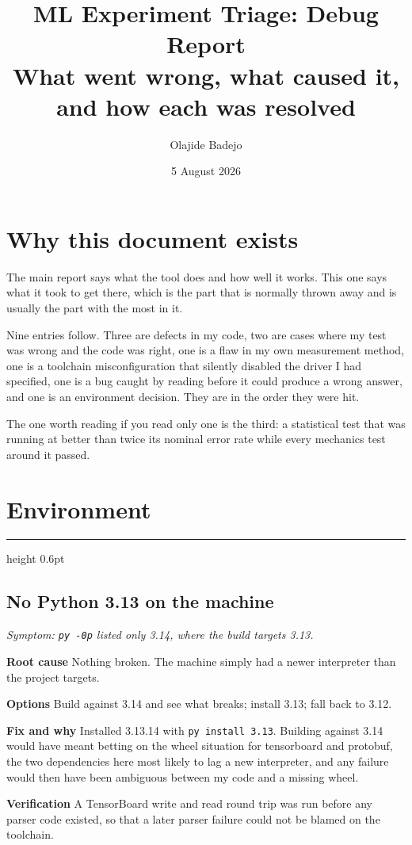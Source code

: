 \documentclass[11pt,a4paper]{article}
\title{\textbf{ML Experiment Triage: Debug Report}\\[0.4em]
\large What went wrong, what caused it, and how each was resolved}
\author{Olajide Badejo}
\date{5 August 2026}
\newcommand{\entry}[2]{%
  \vspace{0.6em}%
  {\color{rulegrey}\hrule height 0.6pt}%
  \vspace{0.5em}%
  \subsection*{#1}%
  \textit{\small #2}\par\vspace{0.3em}%
}
\newcommand{\field}[1]{\vspace{0.35em}\textbf{#1}\quad}
\begin{document}
\maketitle

\section*{Why this document exists}

The main report says what the tool does and how well it works. This one says what
it took to get there, which is the part that is normally thrown away and is
usually the part with the most in it.

Nine entries follow. Three are defects in my code, two are cases where my test
was wrong and the code was right, one is a flaw in my own measurement method, one
is a toolchain misconfiguration that silently disabled the driver I had
specified, one is a bug caught by reading before it could produce a wrong answer,
and one is an environment decision. They are in the order they were hit.

The one worth reading if you read only one is the third: a statistical test that
was running at better than twice its nominal error rate while every mechanics
test around it passed.

\section{Environment}

\entry{No Python 3.13 on the machine}{Symptom: \texttt{py -0p} listed only 3.14,
where the build targets 3.13.}

\field{Root cause} Nothing broken. The machine simply had a newer interpreter
than the project targets.

\field{Options} Build against 3.14 and see what breaks; install 3.13; fall back
to 3.12.

\field{Fix and why} Installed 3.13.14 with \texttt{py install 3.13}. Building
against 3.14 would have meant betting on the wheel situation for tensorboard and
protobuf, the two dependencies here most likely to lag a new interpreter, and any
failure would then have been ambiguous between my code and a missing wheel.

\field{Verification} A TensorBoard write and read round trip was run before any
parser code existed, so that a later parser failure could not be blamed on the
toolchain.
\end{document}
